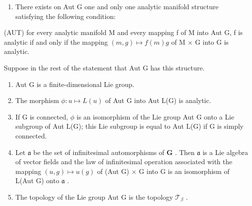 \begin{enumerate}
\def\labelenumi{(\roman{enumi})}
\tightlist
\item
  There exists on Aut G one and only one analytic manifold structure satisfying the following condition:
\end{enumerate}

(AUT) for every analytic manifold M and every mapping f of M into Aut G, f is analytic if and only if the mapping \((m, g) \mapsto f(m)g\) of M × G into G is analytic.

Suppose in the rest of the statement that Aut G has this structure.

\begin{enumerate}
\def\labelenumi{(\roman{enumi})}
\setcounter{enumi}{1}
\item
  Aut G is a finite-dimensional Lie group.
\item
  The morphism \(\phi: u \mapsto L(u)\) of Aut G into Aut L(G) is analytic.
\item
  If G is connected, \(\phi\) is an isomorphism of the Lie group Aut G onto a Lie subgroup of Aut L(G); this Lie subgroup is equal to Aut L(G) if G is simply connected.
\item
  Let \(\mathfrak{a}\) be the set of infinitesimal automorphisms of \(\mathbf{G}\) . Then \(\mathfrak{a}\) is a Lie algebra of vector fields and the law of infinitesimal operation associated with the mapping \((u, g) \mapsto u(g)\) of (Aut G) \(\times\) G into G is an isomorphism of L(Aut G) onto \(\mathfrak{a}\) .
\item
  The topology of the Lie group Aut G is the topology \(\mathcal{T}_{\beta}\) .
\end{enumerate}

